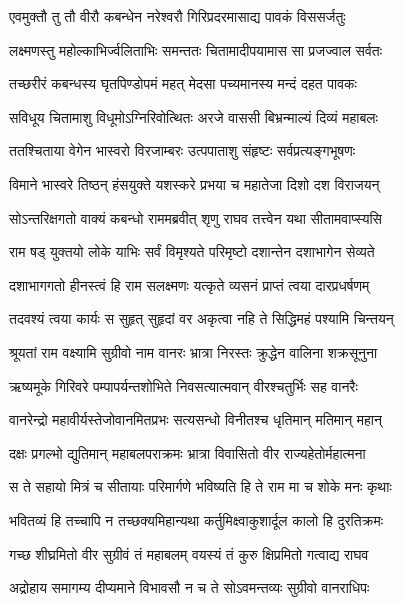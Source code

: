
\twolineshloka
{एवमुक्तौ तु तौ वीरौ कबन्धेन नरेश्वरौ}
{गिरिप्रदरमासाद्य पावकं विससर्जतुः} %

\twolineshloka
{लक्ष्मणस्तु महोल्काभिर्ज्वलिताभिः समन्ततः}
{चितामादीपयामास सा प्रजज्वाल सर्वतः} %

\twolineshloka
{तच्छरीरं कबन्धस्य घृतपिण्डोपमं महत्}
{मेदसा पच्यमानस्य मन्दं दहत पावकः} %

\twolineshloka
{सविधूय चितामाशु विधूमोऽग्निरिवोत्थितः}
{अरजे वाससी बिभ्रन्माल्यं दिव्यं महाबलः} %

\twolineshloka
{ततश्चिताया वेगेन भास्वरो विरजाम्बरः}
{उत्पपाताशु संहृष्टः सर्वप्रत्यङ्गभूषणः} %

\twolineshloka
{विमाने भास्वरे तिष्ठन् हंसयुक्ते यशस्करे}
{प्रभया च महातेजा दिशो दश विराजयन्} %

\twolineshloka
{सोऽन्तरिक्षगतो वाक्यं कबन्धो राममब्रवीत्}
{शृणु राघव तत्त्वेन यथा सीतामवाप्स्यसि} %

\twolineshloka
{राम षड् युक्तयो लोके याभिः सर्वं विमृश्यते}
{परिमृष्टो दशान्तेन दशाभागेन सेव्यते} %

\twolineshloka
{दशाभागगतो हीनस्त्वं हि राम सलक्ष्मणः}
{यत्कृते व्यसनं प्राप्तं त्वया दारप्रधर्षणम्} %

\twolineshloka
{तदवश्यं त्वया कार्यः स सुहृत् सुहृदां वर}
{अकृत्वा नहि ते सिद्धिमहं पश्यामि चिन्तयन्} %

\twolineshloka
{श्रूयतां राम वक्ष्यामि सुग्रीवो नाम वानरः}
{भ्रात्रा निरस्तः क्रुद्धेन वालिना शक्रसूनुना} %

\twolineshloka
{ऋष्यमूके गिरिवरे पम्पापर्यन्तशोभिते}
{निवसत्यात्मवान् वीरश्चतुर्भिः सह वानरैः} %

\twolineshloka
{वानरेन्द्रो महावीर्यस्तेजोवानमितप्रभः}
{सत्यसन्धो विनीतश्च धृतिमान् मतिमान् महान्} %

\twolineshloka
{दक्षः प्रगल्भो द्युतिमान् महाबलपराक्रमः}
{भ्रात्रा विवासितो वीर राज्यहेतोर्महात्मना} %

\twolineshloka
{स ते सहायो मित्रं च सीतायाः परिमार्गणे}
{भविष्यति हि ते राम मा च शोके मनः कृथाः} %

\twolineshloka
{भवितव्यं हि तच्चापि न तच्छक्यमिहान्यथा}
{कर्तुमिक्ष्वाकुशार्दूल कालो हि दुरतिक्रमः} %

\twolineshloka
{गच्छ शीघ्रमितो वीर सुग्रीवं तं महाबलम्}
{वयस्यं तं कुरु क्षिप्रमितो गत्वाद्य राघव} %

\twolineshloka
{अद्रोहाय समागम्य दीप्यमाने विभावसौ}
{न च ते सोऽवमन्तव्यः सुग्रीवो वानराधिपः} %

